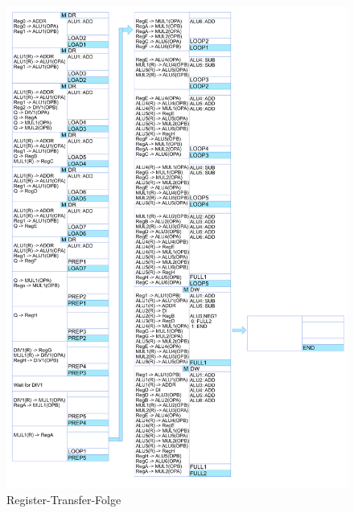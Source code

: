 \documentclass{article}
\begin{document}
    \begin{figure}
        \includegraphics[width=\textwidth]{../Diagramme/RegisterTransferfolge/RegisterTransferFolgeKomplett.png}
        \caption{Register-Transfer-Folge}
        \label{RT-Folge}
    \end{figure}
\end{document}
